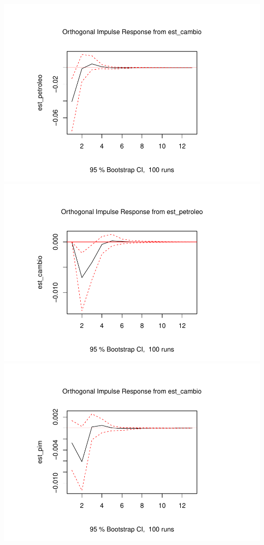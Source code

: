 \documentclass[12pt]{article}
\begin{document}
\includegraphics{article_files/figure-latex/unnamed-chunk-14-7.pdf}
\includegraphics{article_files/figure-latex/unnamed-chunk-14-8.pdf}
\includegraphics{article_files/figure-latex/unnamed-chunk-14-9.pdf}
\end{document}

